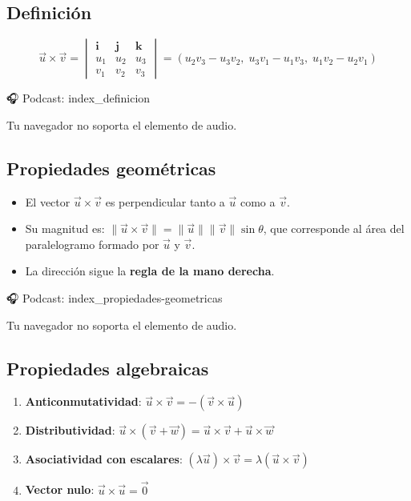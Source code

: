 \documentclass[
]{book}
\providecommand{\tightlist}{%
  \setlength{\itemsep}{0pt}\setlength{\parskip}{0pt}}
\begin{document}
\subsection{Definición}\label{definiciuxf3n}

\[
\vec{u} \times \vec{v} = \begin{vmatrix}
\mathbf{i} & \mathbf{j} & \mathbf{k} \\
u_1 & u_2 & u_3 \\
v_1 & v_2 & v_3
\end{vmatrix} = (u_2 v_3 - u_3 v_2,\; u_3 v_1 - u_1 v_3,\; u_1 v_2 - u_2 v_1)
\]

🎧 Podcast: index\_definicion

Tu navegador no soporta el elemento de audio.

\subsection{Propiedades geométricas}\label{propiedades-geomuxe9tricas}

\begin{itemize}
\tightlist
\item
  El vector \(\vec{u} \times \vec{v}\) es perpendicular tanto a \(\vec{u}\) como a \(\vec{v}\).
\item
  Su magnitud es: \(\|\vec{u} \times \vec{v}\| = \|\vec{u}\| \|\vec{v}\| \sin\theta\), que corresponde al área del paralelogramo formado por \(\vec{u}\) y \(\vec{v}\).
\item
  La dirección sigue la \textbf{regla de la mano derecha}.
\end{itemize}

🎧 Podcast: index\_propiedades-geometricas

Tu navegador no soporta el elemento de audio.

\subsection{Propiedades algebraicas}\label{propiedades-algebraicas}

\begin{enumerate}
\def\labelenumi{\arabic{enumi}.}
\tightlist
\item
  \textbf{Anticonmutatividad}: \(\vec{u} \times \vec{v} = -(\vec{v} \times \vec{u})\)
\item
  \textbf{Distributividad}: \(\vec{u} \times (\vec{v} + \vec{w}) = \vec{u} \times \vec{v} + \vec{u} \times \vec{w}\)
\item
  \textbf{Asociatividad con escalares}: \((\lambda \vec{u}) \times \vec{v} = \lambda (\vec{u} \times \vec{v})\)
\item
  \textbf{Vector nulo}: \(\vec{u} \times \vec{u} = \vec{0}\)
\end{enumerate}
\end{document}

